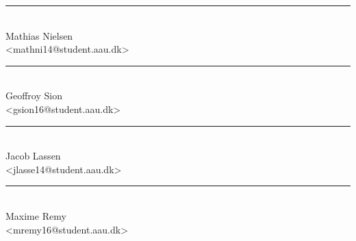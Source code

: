 \begin{center}
\begin{minipage}[b]{0.45\textwidth}
 \centering
 \rule{\textwidth}{0.5pt}\\
  Mathias Nielsen\\
 {\footnotesize <mathni14@student.aau.dk>}
\end{minipage}
\hspace{0.3cm}
\begin{minipage}[b]{0.45\textwidth}
 \centering
 \rule{\textwidth}{0.5pt}\\
  Geoffroy Sion\\
 {\footnotesize <gsion16@student.aau.dk>}
\end{minipage}

\end{center}
\vspace{3\baselineskip}
\begin{center}

\begin{minipage}[b]{0.45\textwidth}
 \centering
 \rule{\textwidth}{0.5pt}\\
  Jacob Lassen\\
 {\footnotesize <jlasse14@student.aau.dk>}
\end{minipage}
\hspace{0.3cm}
\begin{minipage}[b]{0.45\textwidth}
 \centering
 \rule{\textwidth}{0.5pt}\\
  Maxime Remy\\
 {\footnotesize <mremy16@student.aau.dk>}
\end{minipage}

\end{center}
\vspace{3\baselineskip}
